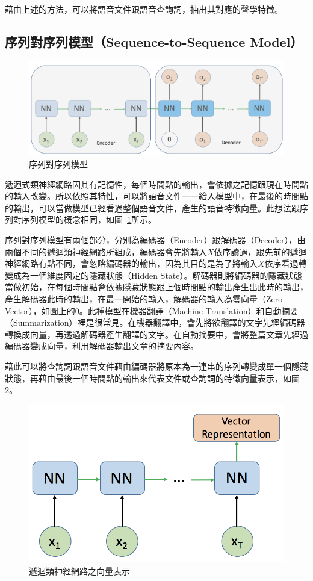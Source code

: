 藉由上述的方法，可以將語音文件跟語音查詢詞，抽出其對應的聲學特徵。
\subsection{序列對序列模型（Sequence-to-Sequence Model）\cite{sutskever2014sequence}}
\begin{figure}[h]
\centering
\includegraphics[scale=0.5]{images/ch3_seq2seq.png} 
\caption{序列對序列模型}
\label{ch3_seq2seq}
\end{figure}
遞迴式類神經網路因其有記憶性，每個時間點的輸出，會依據之記憶跟現在時間點的輸入改變。所以依照其特性，可以將語音文件一一給入模型中，在最後的時間點的輸出，可以當做模型已經看過整個語音文件，產生的語音特徵向量。此想法跟序列對序列模型的概念相同，如圖~\ref{ch3_seq2seq}所示。

序列對序列模型有兩個部分，分別為編碼器（Encoder）跟解碼器（Decoder），由兩個不同的遞迴類神經網路所組成，編碼器會先將輸入$X$依序讀過，跟先前的遞迴神經網路有點不同，會忽略編碼器的輸出，因為其目的是為了將輸入$X$依序看過轉變成為一個維度固定的隱藏狀態（Hidden
State）。解碼器則將編碼器的隱藏狀態當做初始，在每個時間點會依據隱藏狀態跟上個時間點的輸出產生出此時的輸出，產生解碼器此時的輸出，在最一開始的輸入，解碼器的輸入為零向量（Zero
Vector），如圖上的$0$。此種模型在機器翻譯（Machine
Translation）和自動摘要（Summarization）裡是很常見。在機器翻譯中，會先將欲翻譯的文字先經編碼器轉換成向量，再透過解碼器產生翻譯的文字。在自動摘要中，會將整篇文章先經過編碼器變成向量，利用解碼器輸出文章的摘要內容。

藉此可以將查詢詞跟語音文件藉由編碼器將原本為一連串的序列轉變成單一個隱藏狀態，再藉由最後一個時間點的輸出來代表文件或查詢詞的特徵向量表示，如圖\ref{ch3_RNNVC}。

\begin{figure}[h]
\centering
\includegraphics[scale=0.5]{images/ch3_RNNVC.png} 
\caption{遞迴類神經網路之向量表示}
\label{ch3_RNNVC}
\end{figure}

